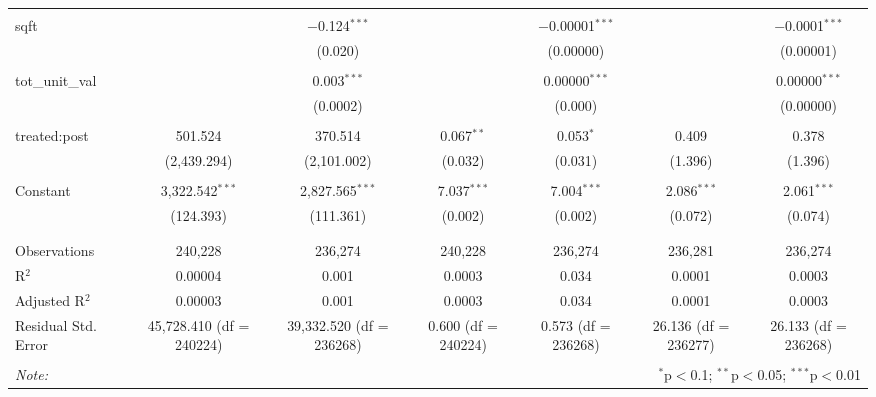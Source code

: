 \begin{table}[H]
{\begin{tabular}{@{\extracolsep{5pt}}lcccccc}
   & & & & & & \\  

  sqft &  & $-$0.124$^{***}$ &  & $-$0.00001$^{***}$ &  & $-$0.0001$^{***}$ \\  

   &  & (0.020) &  & (0.00000) &  & (0.00001) \\  

   & & & & & & \\  

  tot\_unit\_val &  & 0.003$^{***}$ &  & 0.00000$^{***}$ &  & 0.00000$^{***}$ \\  

   &  & (0.0002) &  & (0.000) &  & (0.00000) \\  

   & & & & & & \\  

  treated:post & 501.524 & 370.514 & 0.067$^{**}$ & 0.053$^{*}$ & 0.409 & 0.378 \\  

   & (2,439.294) & (2,101.002) & (0.032) & (0.031) & (1.396) & (1.396) \\  

   & & & & & & \\  

  Constant & 3,322.542$^{***}$ & 2,827.565$^{***}$ & 7.037$^{***}$ & 7.004$^{***}$ & 2.086$^{***}$ & 2.061$^{***}$ \\  

   & (124.393) & (111.361) & (0.002) & (0.002) & (0.072) & (0.074) \\  

   & & & & & & \\  

 \hline \\[-1.8ex]  

 Observations & 240,228 & 236,274 & 240,228 & 236,274 & 236,281 & 236,274 \\  

 R$^{2}$ & 0.00004 & 0.001 & 0.0003 & 0.034 & 0.0001 & 0.0003 \\  

 Adjusted R$^{2}$ & 0.00003 & 0.001 & 0.0003 & 0.034 & 0.0001 & 0.0003 \\  

 Residual Std. Error & 45,728.410 (df = 240224) & 39,332.520 (df = 236268) & 0.600 (df = 240224) & 0.573 (df = 236268) & 26.136 (df = 236277) & 26.133 (df = 236268) \\  

 \hline  

 \hline \\[-1.8ex]  

 \textit{Note:}  & \multicolumn{6}{r}{$^{*}$p$<$0.1; $^{**}$p$<$0.05; $^{***}$p$<$0.01} \\  

 \end{tabular}}  

 \end{table}  

